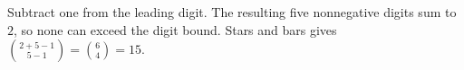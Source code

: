 Subtract one from the leading digit. The resulting five nonnegative digits sum to $2$, so none can exceed the digit bound. Stars and bars gives $\binom{2+5-1}{5-1}=\binom64=\boxed{15}$.
